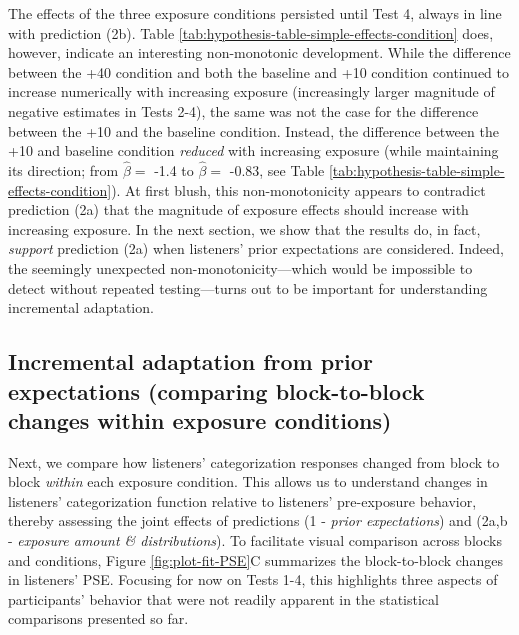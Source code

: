 \documentclass[
  11pt,
  man,mask,floatsintext]{apa6}
\begin{document}
The effects of the three exposure conditions persisted until Test 4, always in line with prediction (2b). Table \ref{tab:hypothesis-table-simple-effects-condition} does, however, indicate an interesting non-monotonic development. While the difference between the +40 condition and both the baseline and +10 condition continued to increase numerically with increasing exposure (increasingly larger magnitude of negative estimates in Tests 2-4), the same was not the case for the difference between the +10 and the baseline condition. Instead, the difference between the +10 and baseline condition \emph{reduced} with increasing exposure (while maintaining its direction; from \(\hat{\beta} =\) -1.4 to \(\hat{\beta} =\) -0.83, see Table \ref{tab:hypothesis-table-simple-effects-condition}). At first blush, this non-monotonicity appears to contradict prediction (2a) that the magnitude of exposure effects should increase with increasing exposure. In the next section, we show that the results do, in fact, \emph{support} prediction (2a) when listeners' prior expectations are considered. Indeed, the seemingly unexpected non-monotonicity---which would be impossible to detect without repeated testing---turns out to be important for understanding incremental adaptation.

\subsection{Incremental adaptation from prior expectations (comparing block-to-block changes within exposure conditions)}\label{incremental-adaptation-from-prior-expectations-comparing-block-to-block-changes-within-exposure-conditions}

Next, we compare how listeners' categorization responses changed from block to block \emph{within} each exposure condition. This allows us to understand changes in listeners' categorization function relative to listeners' pre-exposure behavior, thereby assessing the joint effects of predictions (1 - \emph{prior expectations}) and (2a,b - \emph{exposure amount \& distributions}). To facilitate visual comparison across blocks and conditions, Figure \ref{fig:plot-fit-PSE}C summarizes the block-to-block changes in listeners' PSE. Focusing for now on Tests 1-4, this highlights three aspects of participants' behavior that were not readily apparent in the statistical comparisons presented so far.
\end{document}
